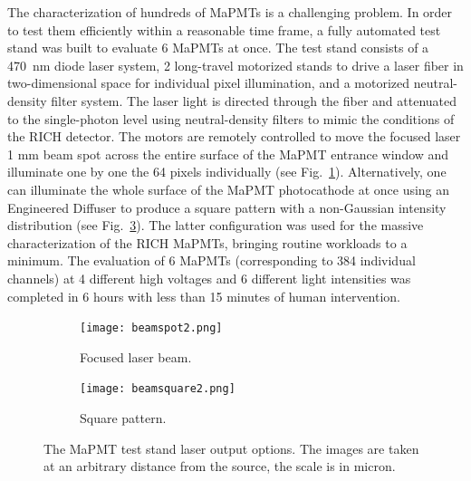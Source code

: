 \documentclass[5p,times,twocolumn]{elsarticle}
\begin{document}
The characterization of hundreds of MaPMTs is a  challenging problem. In order to test them efficiently within a
reasonable time frame, a fully automated test stand was built to evaluate 6 MaPMTs at once. The test stand consists
of a 470~nm diode laser system, 2 long-travel motorized stands to drive a laser fiber in two-dimensional space for
individual pixel illumination, and a motorized neutral-density filter system. The laser light is directed through the
fiber and attenuated to the single-photon level using neutral-density filters to mimic the conditions of the RICH
detector. The motors are remotely controlled to move the focused laser 1 mm beam spot across the entire surface of the MaPMT
entrance window and illuminate one by one the 64 pixels individually (see Fig.~\ref{fig:beamopt1}). Alternatively, one
can illuminate the whole surface of the MaPMT photocathode at once using an Engineered Diffuser to produce a square
pattern with a non-Gaussian intensity distribution (see Fig.~\ref{fig:beamopt2}). The latter configuration was used for the
massive characterization of the RICH MaPMTs, bringing routine workloads to a minimum. The evaluation of 6 MaPMTs
(corresponding to 384 individual channels) at 4 different high voltages and 6 different light intensities was completed
in 6 hours with less than 15 minutes of human intervention.

\begin{figure}[bt]
	\centering
	\begin{subfigure}[b]{0.60\linewidth}
		\texttt{[image: beamspot2.png]}
		\caption{Focused laser beam.}
		\label{fig:beamopt1}
	\end{subfigure}
	\begin{subfigure}[b]{0.38\linewidth}
		\texttt{[image: beamsquare2.png]}
		\caption{Square pattern.}
		\label{fig:beamopt2}
	\end{subfigure}
	\caption{The MaPMT test stand laser output options. The images are taken at an arbitrary distance from the source, the scale is in micron. }
\end{figure}

\end{document}
